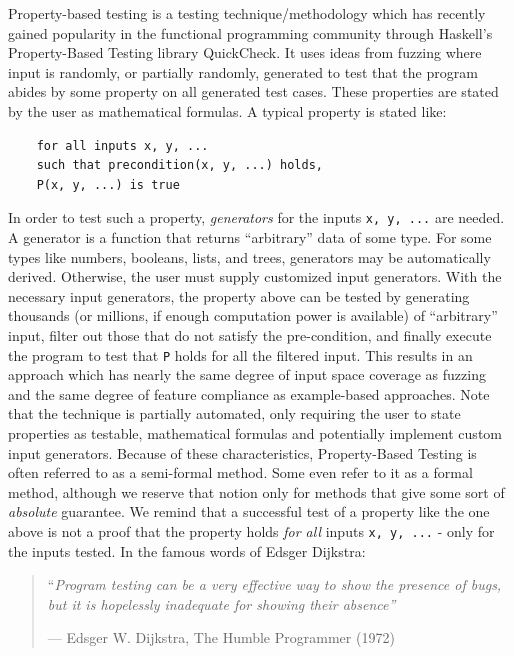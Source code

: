 \documentclass[twoside,11pt,openright]{report}
\newcommand{\pbt}{Property-Based Testing}
\begin{document}
Property-based testing is a testing technique/methodology which has recently gained popularity in the functional programming community through Haskell's \pbt{} library QuickCheck\cite{claessen2011quickcheck}. It uses ideas from fuzzing where input is randomly, or partially randomly, generated to test that the program abides by some property on all generated test cases. These properties are stated by the user as mathematical formulas. A typical property is stated like:
\begin{verbatim}
    for all inputs x, y, ...
    such that precondition(x, y, ...) holds,
    P(x, y, ...) is true
\end{verbatim}
In order to test such a property, \textit{generators} for the inputs \texttt{x, y, ...} are needed. A generator is a function that returns ``arbitrary'' data of some type. For some types like numbers, booleans, lists, and trees, generators may be automatically derived. Otherwise, the user must supply customized input generators. With the necessary input generators, the property above can be tested by generating thousands (or millions, if enough computation power is available) of ``arbitrary'' input, filter out those that do not satisfy the pre-condition, and finally execute the program to test that \texttt{P} holds for all the filtered input. This results in an approach which has nearly the same degree of input space coverage as fuzzing and the same degree of feature compliance as example-based approaches. Note that the technique is partially automated, only requiring the user to state properties as testable, mathematical formulas and potentially implement custom input generators. Because of these characteristics, \pbt{} is often referred to as a semi-formal method. Some even refer to it as a formal method, although we reserve that notion only for methods that give some sort of \textit{absolute} guarantee. We remind that a successful test of a property like the one above is not a proof that the property holds \textit{for all} inputs \texttt{x, y, ...} - only for the inputs tested. In the famous words of Edsger Dijkstra:
\begin{quote}
    ``\textit{Program testing can be a very effective way to show the presence of bugs, but it is hopelessly inadequate for
    showing their absence''}\cite{humbleprogrammer1972}
    \begin{flushright}
    --- Edsger W. Dijkstra, The Humble Programmer (1972)
    \end{flushright}
\end{quote}
\end{document}
